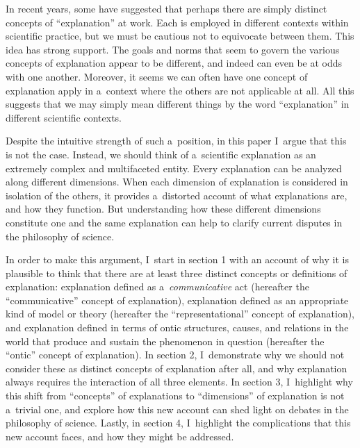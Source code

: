 In recent years, some have suggested that perhaps there are simply distinct concepts of ``explanation'' at work. Each is employed in different contexts within scientific practice, but we must be cautious not to equivocate between them. This idea has strong support. The goals and norms that seem to govern the various concepts of explanation appear to be different, and indeed can even be at odds with one another. Moreover, it seems we can often have one concept of explanation apply in a~context where the others are not applicable at all. All this suggests that we may simply mean different things by the word ``explanation'' in different scientific contexts.

Despite the intuitive strength of such a~position, in this paper I~argue that this is not the case. Instead, we should think of a~scientific explanation as an extremely complex and multifaceted entity. Every explanation can be analyzed along different dimensions. When each dimension of explanation is considered in isolation of the others, it provides a~distorted account of what explanations are, and how they function. But understanding how these different dimensions constitute one and the same explanation can help to clarify current disputes in the philosophy of science.

In order to make this argument, I~start in section 1 with an account of why it is plausible to think that there are at least three distinct concepts or definitions of explanation: explanation defined as a~\textit{communicative} act (hereafter the ``communicative'' concept of explanation), explanation defined as an appropriate kind of model or theory (hereafter the ``representational'' concept of explanation), and explanation defined in terms of ontic structures, causes, and relations in the world that produce and sustain the phenomenon in question (hereafter the ``ontic'' concept of explanation). In section 2, I~demonstrate why we should not consider these as distinct concepts of explanation after all, and why explanation always requires the interaction of all three elements. In section 3, I~highlight why this shift from ``concepts'' of explanations to ``dimensions'' of explanation is not a~trivial one, and explore how this new account can shed light on debates in the philosophy of science. Lastly, in section 4, I~highlight the complications that this new account faces, and how they might be addressed.


